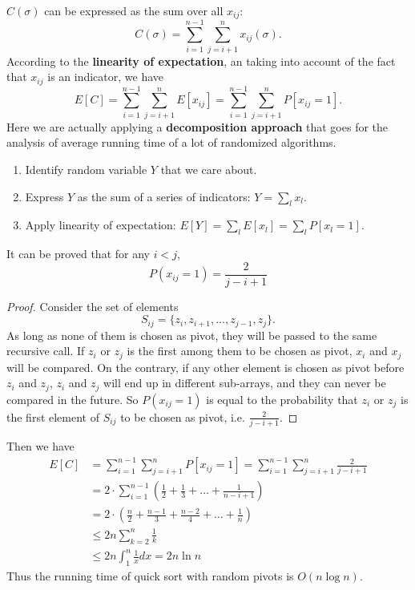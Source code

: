 $C(\sigma)$ can be expressed as the sum over all $x_{ij}$:
\begin{equation*}
C(\sigma)=\sum\limits_{i=1}^{n-1}\sum\limits_{j=i+1}^{n}x_{ij}(\sigma).
\end{equation*}
According to the \textbf{linearity of expectation}, an taking into account of the fact that $x_{ij}$ is an indicator, we have
\begin{equation*}
E[C]=\sum\limits_{i=1}^{n-1}\sum\limits_{j=i+1}^{n}E[x_{ij}]=\sum\limits_{i=1}^{n-1}\sum\limits_{j=i+1}^{n}P[x_{ij}=1].
\end{equation*}
Here we are actually applying a \textbf{decomposition approach} that goes for the analysis of average running time of a lot of randomized algorithms. 
\begin{enumerate}
\item Identify random variable $Y$ that we care about.
\item Express $Y$ as the sum of a series of indicators: $Y=\sum\limits_lx_l$.
\item Apply linearity of expectation: $E[Y]=\sum\limits_lE[x_l]=\sum\limits_lP[x_l=1]$.
\end{enumerate}
It can be proved that for any $i<j$,
$$P(x_{ij}=1)=\frac{2}{j-i+1}$$
\begin{proof}
Consider the set of elements 
$$S_{ij}=\{z_i,z_{i+1},\dots,z_{j-1},z_j\}.$$
As long as none of them is chosen as pivot, they will be passed to the same recursive call. If $z_i$ or $z_j$ is the first among them to be chosen as pivot, $x_i$ and $x_j$ will be compared. On the contrary, if any other element is chosen as pivot before $z_i$ and $z_j$, $z_i$ and $z_j$ will end up in different sub-arrays, and they can never be compared in the future. So $P(x_{ij}=1)$ is equal to the probability that $z_i$ or $z_j$ is the first element of $S_{ij}$ to be chosen as pivot, i.e. $\frac{2}{j-i+1}$.
\end{proof}
Then we have 
\begin{align*}
E[C]&=\sum\limits_{i=1}^{n-1}\sum\limits_{j=i+1}^{n}P[x_{ij}=1]=\sum\limits_{i=1}^{n-1}\sum\limits_{j=i+1}^{n}\frac{2}{j-i+1}\\
&=2\cdot\sum\limits_{i=1}^{n-1}\left(\frac{1}{2}+\frac{1}{3}+\dots+\frac{1}{n-i+1}\right)\\
&=2\cdot\left(\frac{n}{2}+\frac{n-1}{3}+\frac{n-2}{4}+\dots+\frac{1}{n}\right)\\
&\leq2n\sum\limits_{k=2}^n\frac{1}{k}\\
&\leq2n\int_1^n\frac{1}{x}dx=2n\ln n
\end{align*}
Thus the running time of quick sort with random pivots is $O(n\log n)$.
